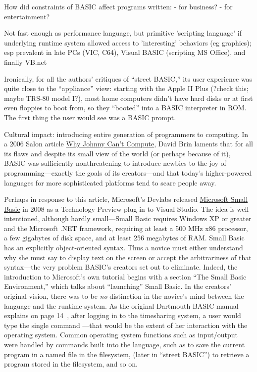 \documentclass{article}
\begin{document}
How did constraints of BASIC affect programs written:
- for business?
- for entertainment?

Not fast enough as performance language, but primitive 'scripting
language' if underlying runtime system allowed access to 'interesting'
behaviors (eg graphics); esp prevalent in late PCs (VIC, C64), Visual
BASIC (scripting MS Office), and finally VB.net


Ironically, for all the authors' critiques of ``street BASIC,'' its user
experience was quite close to the ``appliance'' view: starting with the
Apple II Plus (?check this; maybe TRS-80 model I?), most home computers
didn't have hard disks or at first even floppies to boot from, so they
``booted'' into a BASIC interpreter in ROM.  The first thing the user
would see was a BASIC prompt. 


Cultural impact: introducing entire generation of programmers to
computing.
In a 2006 Salon article \href{www.salon.com/2006/09/14/basic_2}{Why Johnny
  Can't Compute},
David Brin laments that for
all its flaws and despite its small view of the world (or perhaps
because of it), BASIC was sufficiently
nonthreatening to introduce newbies to the joy of programming---exactly
the goals of its creators---and that today's higher-powered languages
for more sophisticated platforms tend to scare people away.

Perhaps in response to this article, Microsoft's Devlabs 
released \href{http://smallbasic.com}{Microsoft Small Basic} in 2008 as a
Technology Preview plug-in to Visual Studio.
The idea is well-intentioned, although hardly small---Small Basic
requires Windows XP or greater and the Microsoft .NET framework,
requiring at least a 500
MHz x86 processor, a few gigabytes of disk space, and at least 256
megabytes of RAM.
Small Basic has an explicitly
object-oriented syntax.  Thus a novice must either understand why she
must say  to display text on the
screen or accept the arbitrariness of that syntax---the very problem
BASIC's creators set out to eliminate.  Indeed, the introduction to
Microsoft's own tutorial begins with a section ``The Small Basic
Environment,'' which talks about ``launching'' Small Basic.  In the
creators' original vision, there was to be \emph{no} distinction in the
novice's mind between the language and the runtime system.  As the
original Dartmouth BASIC manual explains on page
14~\cite{dartmouth_basic_manual}, after logging in to the timesharing
system, a user would type the single command ---that would be the
extent of her interaction with the operating system.  Common operating
system functions such as input/output were handled by commands built
into the language, such as  to save the current program in a
named file in the filesystem,  (later  in ``street
BASIC'') to retrieve a program stored in the filesystem, and so on.
\end{document}
